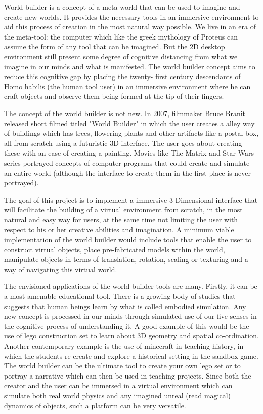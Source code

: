 World builder is a concept of a meta-world that can be used to imagine and create new worlds. It provides the necessary tools in an immersive
 environment to aid this process of creation in the most natural way possible. We live in an era of the meta-tool: the computer which like the greek 
 mythology of Proteus can assume the form of any tool that can be imagined. But the 2D desktop environment still present some degree of cognitive 
 distancing from what we imagine in our minds and what is manifested. The world builder concept aims to reduce this cognitive gap by placing the twenty-
 first century descendants of Homo habilis (the human tool user) in an immersive environment where he can craft objects and observe them being formed at
  the tip of their fingers.


The concept of the world builder is not new. In 2007, filmmaker Bruce Branit released short filmed titled "World Builder" \cite{video:WorldBuilder} in which the user creates a 
alley way of buildings which has trees, flowering plants and other artifacts like a postal box, all from scratch using a futuristic 3D interface. The 
user goes about creating these with an ease of creating a painting. Movies like The Matrix and Star Wars series portrayed concepts of computer programs
 that could create and simulate an entire world (although the interface to create them in the first place is never portrayed).


The goal of this project is to implement a immersive 3 Dimensional interface that will facilitate the building of a virtual environment from scratch, in
 the most natural and easy way for users, at the same time not limiting the user with respect to his or her creative abilities and imagination. A 
 minimum viable implementation of the world builder would include tools that enable the user to construct virtual objects, place pre-fabricated models 
 within the world, manipulate objects in terms of translation, rotation, scaling or texturing and a way of navigating this virtual world.



The envisioned applications of the world builder tools are many. Firstly, it can be a most amenable educational tool. There is a growing body of studies 
that suggests that human beings learn by what is called embodied simulation. Any new concept is processed in our minds through simulated use of our five
 senses in the cognitive process of understanding it. A good example of this would be the use of lego construction set to learn about 3D geometry and 
 spatial co-ordination.  Another contemporary example is the use of minecraft in teaching history, in which the students re-create and explore a 
 historical setting in the sandbox game. The world builder can be the ultimate tool to create your own lego set or to portray a narrative which can then
  be used in teaching projects. Since both the creator and the user can be immersed in a virtual environment which can simulate both real world physics 
  and any imagined unreal (read magical) dynamics of objects, such a platform can be very versatile. 


